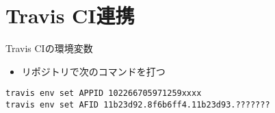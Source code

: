 \documentclass[t]{beamer}
\begin{document}
\section{Travis CI連携}
\label{sec-3}
\begin{frame}[fragile,label=sec-3-1]{Travis CIの環境変数}
 \begin{itemize}
\item リポジトリで次のコマンドを打つ
\end{itemize}
\begin{verbatim}
travis env set APPID 102266705971259xxxx
travis env set AFID 11b23d92.8f6b6ff4.11b23d93.???????
\end{verbatim}
\end{frame}
\end{document}
